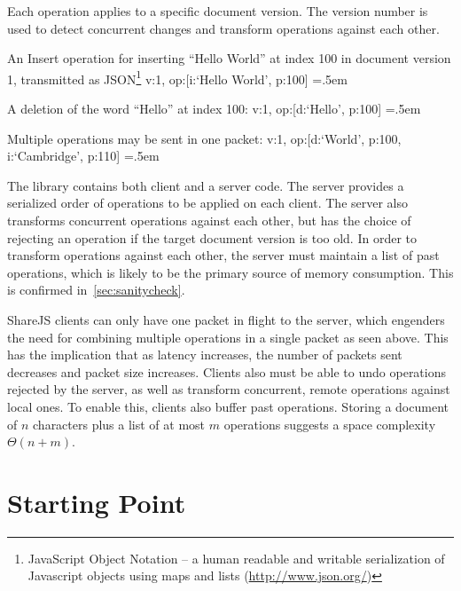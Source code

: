 \documentclass[12pt,a4paper,twoside,openright]{report}
\newenvironment{lcverbatim}
 {\SaveVerbatim{cverb}}
 {\endSaveVerbatim
  \flushleft\fboxrule=0pt\fboxsep=.5em
  \colorbox{cverbbg}{%
    \makebox[\dimexpr\linewidth-2\fboxsep][l]{\BUseVerbatim{cverb}}%
  }
  \endflushleft
}
\begin{document}
	Each operation applies to a specific document version. The version number is used to detect concurrent changes and transform operations against each other.
	
	An Insert operation for inserting ``Hello World'' at index 100 in document version 1, transmitted as JSON\footnote{JavaScript Object Notation -- a human readable and writable serialization of Javascript objects using maps and lists (\url{http://www.json.org/})}
\begin{lcverbatim}
{v:1, op:[{i:`Hello World', p:100}]}
\end{lcverbatim}

	A deletion of the word ``Hello'' at index 100:
\begin{lcverbatim}
{v:1, op:[{d:`Hello', p:100}]}
\end{lcverbatim}

	Multiple operations may be sent in one packet:
\begin{lcverbatim}
{v:1, op:[{d:`World', p:100}, {i:`Cambridge', p:110}]}
\end{lcverbatim}

\vspace{5mm}

	The library contains both client and a server code. The server provides a serialized order of operations to be applied on each client. The server also transforms concurrent operations against each other, but has the choice of rejecting an operation if the target document version is too old. In order to transform operations against each other, the server must maintain a list of past operations, which is likely to be the primary source of memory consumption. This is confirmed in~\cref{sec:sanitycheck}.
	
	ShareJS clients can only have one packet in flight to the server, which engenders the need for combining multiple operations in a single packet as seen above. This has the implication that as latency increases, the number of packets sent decreases and packet size increases. Clients also must be able to undo operations rejected by the server, as well as transform concurrent, remote operations against local ones. To enable this, clients also buffer past operations. Storing a document of $n$ characters plus a list of at most $m$ operations suggests a space complexity $\Theta (n + m)$.

	
\section{Starting Point}
\end{document}
